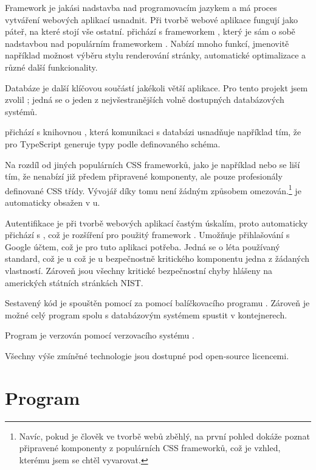 Framework je jakási nadstavba nad programovacím jazykem a má proces vytváření webových aplikací usnadnit. Při tvorbě webové aplikace fungují jako páteř, na které stojí vše ostatní.  přichází s frameworkem , který je sám o sobě nadstavbou nad populárním frameworkem . Nabízí mnoho funkcí, jmenovitě například možnost výběru stylu renderování stránky, automatické optimalizace a různé další funkcionality.\cite{nextjs}

Databáze je další klíčovou součástí jakékoli větší aplikace. Pro tento projekt jsem zvolil ; jedná se o jeden z nejvšestranějších volně dostupných databázových systémů.

 přichází s knihovnou , která komunikaci s databázi usnadňuje například tím, že pro TypeScript generuje typy podle definovaného schéma.

Na rozdíl od jiných populárních CSS frameworků, jako je například  nebo  se  liší tím, že nenabízí již předem připravené komponenty, ale pouze profesionály definované CSS třídy. Vývojář díky tomu není žádným způsobem omezován.\footnote{Navíc, pokud je člověk ve tvorbě webů zběhlý, na první pohled dokáže poznat připravené komponenty z populárních CSS  frameworků, což je vzhled, kterému jsem se chtěl vyvarovat.}  je automaticky obsažen v u.

Autentifikace je při tvorbě webových aplikací častým úskalím, proto  automaticky přichází s , což je rozšíření pro použitý framework . Umožňuje přihlašování s Google účtem, což je pro tuto aplikaci potřeba. Jedná se o léta používaný standard, což je u což je u bezpečnostně kritického komponentu jedna z žádaných vlastností. Zároveň jsou všechny kritické bezpečnostní chyby hlášeny na amerických státních stránkách NIST.

Sestavený kód je spouštěn pomocí  za pomocí balíčkovacího programu . Zároveň je možné celý program spolu s databázovým systémem spustit v  kontejnerech.

Program je verzován pomocí verzovacího systému .

Všechny výše zmíněné technologie jsou dostupné pod open-source licencemi.

\section{Program}

